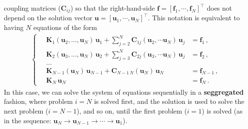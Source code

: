 coupling matrices ($\mathbf{C}_{ij}$) so that the right-hand-side $\mathbf{f}=[\mathbf{f}_1, \cdots, \mathbf{f}_N]^\top$ does not depend
on the solution vector $\mathbf{u}=[\mathbf{u}_1, \cdots, \mathbf{u}_N]^\top$. This notation is equivalent to having $N$ equations of the form
\begin{align}
\left\{
    \begin{aligned}
        \quad \mathbf{K}_1(\mathbf{u}_2, \ldots, \mathbf{u}_N)\, \mathbf{u}_1  + \sum_{j=2}^N \mathbf{C}_{1j} (\mathbf{u}_2, \cdots \mathbf{u}_N)\, \mathbf{u}_j &= \mathbf{f}_1\,, \\
        \quad\mathbf{K}_2(\mathbf{u}_3, \ldots, \mathbf{u}_N)\, \mathbf{u}_2 + \sum_{j=3}^N \mathbf{C}_{2j} (\mathbf{u}_3, \cdots \mathbf{u}_N)\, \mathbf{u}_j &= \mathbf{f}_2\,, \\
        \quad\ldots \\
        \quad\mathbf{K}_{N-1} (\mathbf{u}_N) \, \mathbf{u}_{N-1} + \mathbf{C}_{N-1\, N}(\mathbf{u}_N)\, \mathbf{u}_N &= \mathbf{f}_{N-1} \,, \\
        \quad\mathbf{K}_N \, \mathbf{u}_N &= \mathbf{f}_N\,.
    \end{aligned}
\right.
\end{align}
In this case, we can solve the system of equations sequentially in a \textbf{seggregated} fashion,
 where problem $i=N$ is solved first, and the solution is used to solve the next problem ($i=N-1$), and so on, until the first problem ($i=1$) is solved
 (as in the sequence: $\mathbf{u}_N \to \mathbf{u}_{N-1} \to \cdots \to \mathbf{u}_1$).\\


